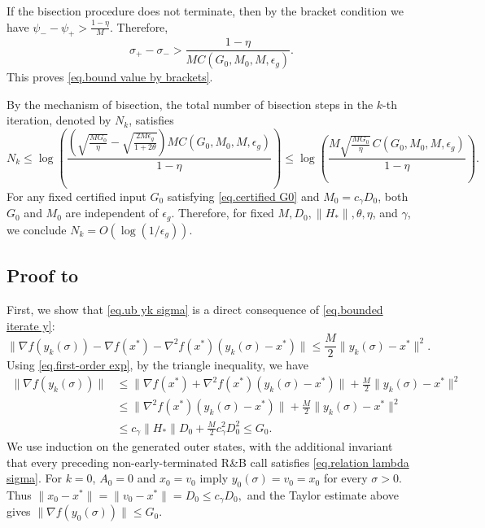 \documentclass[moor,sglanonrev]{informs4}
\begin{document}
\begin{APPENDICES}
    If the bisection procedure does not terminate, then by the bracket condition
    we have
    \(
    \psi_- - \psi_+
    >
    \frac{1-\eta}{M}.
    \)
    Therefore,
    \[
        \sigma_+-\sigma_-
        >
        \frac{1-\eta}
        {M C(G_0,M_0,M,\epsilon_g)}.
    \]
    This proves \eqref{eq.bound value by brackets}.

    By the mechanism of bisection, the total number of bisection steps in the
    \(k\)-th iteration, denoted by \(N_k\), satisfies
    \[
        N_k
        \le
        \log\left(
        \frac{
                \left(
                \sqrt{\frac{MG_0}{\eta}}
                -
                \sqrt{\frac{2M\epsilon_g}{1+2\theta}}
                \right)
                M C(G_0,M_0,M,\epsilon_g)
            }{
                1-\eta
            }
        \right)
        \le
        \log\left(
        \frac{
                M\sqrt{\frac{MG_0}{\eta}}\,
                C(G_0,M_0,M,\epsilon_g)
            }{
                1-\eta
            }
        \right).
    \]
    For any fixed certified input $G_0$ satisfying \eqref{eq.certified G0} and
    $M_0=c_\gamma D_0$, both $G_0$ and $M_0$ are independent of
    $\epsilon_g$. Therefore, for fixed
    $M,D_0,\|H_*\|,\theta,\eta$, and $\gamma$, we conclude
    \(
        N_k=O\!\left(\log(1/\epsilon_g)\right).
    \)
    \Halmos
    \endproof

    \subsection*{Proof to }
    First, we show that \eqref{eq.ub yk sigma} is a direct consequence of \eqref{eq.bounded iterate y}:
    \begin{equation*}
        \|\nabla f(y_k(\sigma)) - \nabla f(x^*) -\nabla^2 f(x^*)(y_k(\sigma)-x^*)\| \leq \frac{M}{2}\|y_k(\sigma)-x^*\|^2.
    \end{equation*}
    Using \eqref{eq.first-order exp}, by the triangle inequality, we have
    \begin{equation*}
        \begin{aligned}
            \|\nabla f(y_k(\sigma)) \| & \leq \|\nabla f(x^*)+\nabla^2 f(x^*)(y_k(\sigma)-x^*)\| +\frac{M}{2}\|y_k(\sigma)-x^*\|^2                                    \\
                                       & \leq \|\nabla^2 f(x^*)(y_k(\sigma)-x^*)\|+\frac{M}{2}\|y_k(\sigma)-x^*\|^2                                                   \\
                                       & \leq c_\gamma\|H_*\|D_0+\frac{M}{2}c_\gamma^2D_0^2\leq G_0.
        \end{aligned}
    \end{equation*}
    We use induction on the generated outer states, with the additional invariant that every preceding non-early-terminated R\&B call satisfies \eqref{eq.relation lambda sigma}. For $k=0$, $A_0=0$ and $x_0=v_0$ imply $y_0(\sigma)=v_0=x_0$ for every $\sigma>0$. Thus
    \(
        \|x_0-x^*\|=\|v_0-x^*\|=D_0\leq c_\gamma D_0,
    \)
    and the Taylor estimate above gives $\|\nabla f(y_0(\sigma))\|\leq G_0$.


\end{APPENDICES}
\end{document}
